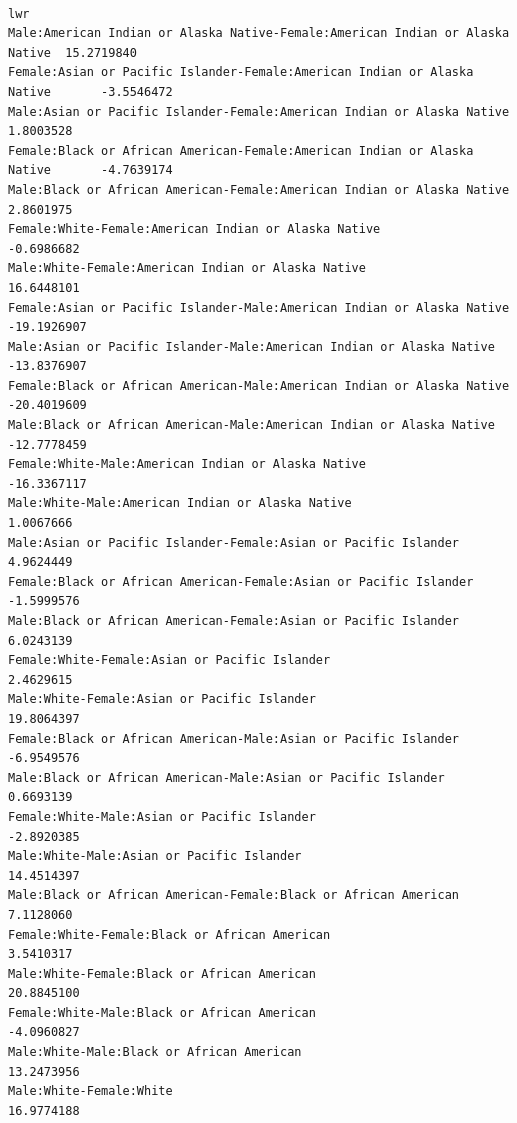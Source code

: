 \documentclass[
  letterpaper,
  DIV=11,
  numbers=noendperiod]{scrartcl}
\begin{document}
\begin{verbatim}
                                                                                      lwr
Male:American Indian or Alaska Native-Female:American Indian or Alaska Native  15.2719840
Female:Asian or Pacific Islander-Female:American Indian or Alaska Native       -3.5546472
Male:Asian or Pacific Islander-Female:American Indian or Alaska Native          1.8003528
Female:Black or African American-Female:American Indian or Alaska Native       -4.7639174
Male:Black or African American-Female:American Indian or Alaska Native          2.8601975
Female:White-Female:American Indian or Alaska Native                           -0.6986682
Male:White-Female:American Indian or Alaska Native                             16.6448101
Female:Asian or Pacific Islander-Male:American Indian or Alaska Native        -19.1926907
Male:Asian or Pacific Islander-Male:American Indian or Alaska Native          -13.8376907
Female:Black or African American-Male:American Indian or Alaska Native        -20.4019609
Male:Black or African American-Male:American Indian or Alaska Native          -12.7778459
Female:White-Male:American Indian or Alaska Native                            -16.3367117
Male:White-Male:American Indian or Alaska Native                                1.0067666
Male:Asian or Pacific Islander-Female:Asian or Pacific Islander                 4.9624449
Female:Black or African American-Female:Asian or Pacific Islander              -1.5999576
Male:Black or African American-Female:Asian or Pacific Islander                 6.0243139
Female:White-Female:Asian or Pacific Islander                                   2.4629615
Male:White-Female:Asian or Pacific Islander                                    19.8064397
Female:Black or African American-Male:Asian or Pacific Islander                -6.9549576
Male:Black or African American-Male:Asian or Pacific Islander                   0.6693139
Female:White-Male:Asian or Pacific Islander                                    -2.8920385
Male:White-Male:Asian or Pacific Islander                                      14.4514397
Male:Black or African American-Female:Black or African American                 7.1128060
Female:White-Female:Black or African American                                   3.5410317
Male:White-Female:Black or African American                                    20.8845100
Female:White-Male:Black or African American                                    -4.0960827
Male:White-Male:Black or African American                                      13.2473956
Male:White-Female:White                                                        16.9774188

\end{verbatim}
\end{document}
